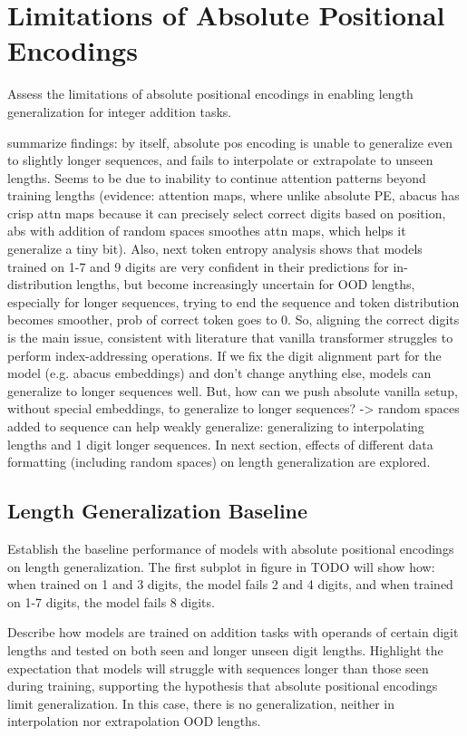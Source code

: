 \section{Limitations of Absolute Positional Encodings}\label{sec:absolute_positional_limitations}
Assess the limitations of absolute positional encodings in enabling length generalization for integer addition tasks.

summarize findings: by itself, absolute pos encoding is unable to generalize even to slightly longer sequences, and fails to interpolate or extrapolate to unseen lengths. Seems to be due to inability to continue attention patterns beyond training lengths (evidence: attention maps, where unlike absolute PE, abacus has crisp attn maps because it can precisely select correct digits based on position, abs with addition of random spaces smoothes attn maps, which helps it generalize a tiny bit). Also, next token entropy analysis shows that models trained on 1-7 and 9 digits are very confident in their predictions for in-distribution lengths, but become increasingly uncertain for OOD lengths, especially for longer sequences, trying to end the sequence and token distribution becomes smoother, prob of correct token goes to 0. So, aligning the correct digits is the main issue, consistent with literature that vanilla transformer struggles to perform index-addressing operations.
If we fix the digit alignment part for the model (e.g. abacus embeddings) and don't change anything else, models can generalize to longer sequences well. But, how can we push absolute vanilla setup, without special embeddings, to generalize to longer sequences? -> random spaces added to sequence can help weakly generalize: generalizing to interpolating lengths and 1 digit longer sequences. In next section, effects of different data formatting (including random spaces) on length generalization are explored.


\subsection{Length Generalization Baseline}
Establish the baseline performance of models with absolute positional encodings on length generalization. The first subplot in figure in TODO will show how: when trained on 1 and 3 digits, the model fails 2 and 4 digits, and when trained on 1-7 digits, the model fails 8 digits.

Describe how models are trained on addition tasks with operands of certain digit lengths and tested on both seen and longer unseen digit lengths. Highlight the expectation that models will struggle with sequences longer than those seen during training, supporting the hypothesis that absolute positional encodings limit generalization. In this case, there is no generalization, neither in interpolation nor extrapolation OOD lengths.

